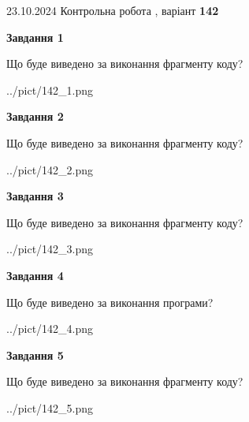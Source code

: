 \documentclass[12pt, ukrainian]{article}
\begin{document}
{\Large{23.10.2024 Контрольна робота , варіант  \No \textbf { 142 }\par}}
{
\begin {large}
{\begin {center}\textbf{Завдання 1}\end {center}}

Що буде виведено за виконання фрагменту коду?\par
\begin{center}
	{../pict/142_1.png}
\end{center}
\newpage

{\begin {center}\textbf{Завдання 2}\end {center}}

Що буде виведено за виконання фрагменту коду?\par
\begin{center}
	{../pict/142_2.png}
\end{center}
\newpage

{\begin {center}\textbf{Завдання 3}\end {center}}

Що буде виведено за виконання фрагменту коду?\par
\begin{center}
	{../pict/142_3.png}
\end{center}
\newpage

{\begin {center}\textbf{Завдання 4}\end {center}}

Що буде виведено за виконання програми?\par
\begin{center}
	{../pict/142_4.png}
\end{center}
\newpage

{\begin {center}\textbf{Завдання 5}\end {center}}

Що буде виведено за виконання фрагменту коду?\par
\begin{center}
	{../pict/142_5.png}
\end{center}
\newpage


\end{large}}
\end{document}
